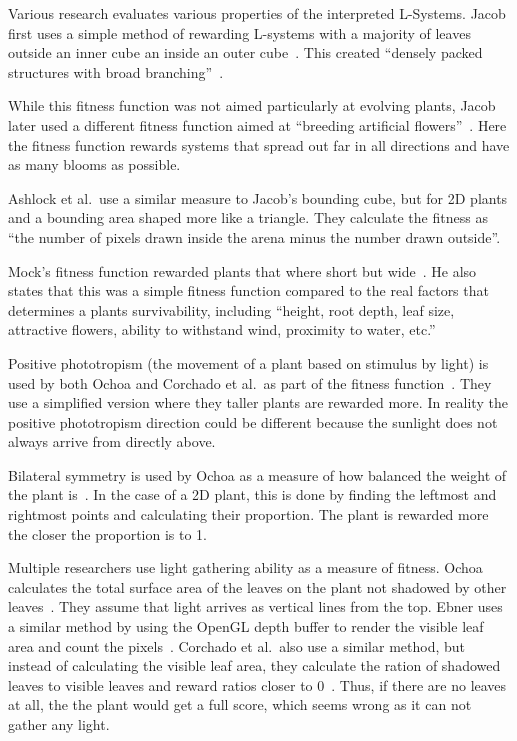 Various research evaluates various properties of the interpreted L-Systems.
Jacob first uses a simple method of rewarding L-systems with a majority of leaves outside an inner cube an inside an outer cube~\cite{1994Jacob}.
This created ``densely packed structures with broad branching''~\cite{1994Jacob}.

While this fitness function was not aimed particularly at evolving plants, Jacob later used a different fitness function aimed at ``breeding artificial flowers''~\cite{1994Jacob}.
Here the fitness function rewards systems that spread out far in all directions and have as many blooms as possible.

Ashlock et al.\ use a similar measure to Jacob's bounding cube, but for 2D plants and a bounding area shaped more like a triangle.
They calculate the fitness as ``the number of pixels drawn inside the arena minus the number drawn outside''.
~\cite{2006Ashlock}

Mock's fitness function rewarded plants that where short but wide~\cite{1998Mock}.
He also states that this was a simple fitness function compared to the real factors that determines a plants survivability, including ``height, root depth, leaf size, attractive flowers, ability to withstand wind, proximity to water, etc.''~\cite{1998Mock}

Positive phototropism (the movement of a plant based on stimulus by light) is used by both Ochoa and Corchado et al.\ as part of the fitness function~\cite{1998Ochoa, 2009Corchado}.
They use a simplified version where they taller plants are rewarded more.
In reality the positive phototropism direction could be different because the sunlight does not always arrive from directly above.

Bilateral symmetry is used by Ochoa as a measure of how balanced the weight of the plant is~\cite{1998Ochoa}.
In the case of a 2D plant, this is done by finding the leftmost and rightmost points and calculating their proportion.
The plant is rewarded more the closer the proportion is to 1.

Multiple researchers use light gathering ability as a measure of fitness.
Ochoa calculates the total surface area of the leaves on the plant not shadowed by other leaves~\cite{1998Ochoa}.
They assume that light arrives as vertical lines from the top.
Ebner uses a similar method by using the OpenGL depth buffer to render the visible leaf area and count the pixels~\cite{2003Ebner}.
Corchado et al.\ also use a similar method, but instead of calculating the visible leaf area, they calculate the ration of shadowed leaves to visible leaves and reward ratios closer to 0~\cite{2009Corchado}.
Thus, if there are no leaves at all, the the plant would get a full score, which seems wrong as it can not gather any light.

